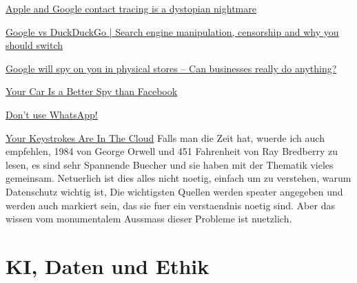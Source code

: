 \documentclass{report}
\begin{document}
\hyperlink{https://youtube.com/watch?v=WRalTWAFBY4}{Apple and Google contact tracing is a dystopian nightmare}

\hyperlink{https://youtube.com/watch?v=SrsCEbi5N7Y}{Google vs DuckDuckGo | Search engine manipulation, censorship and why you should switch}

\hyperlink{https://youtube.com/watch?v=vZBa5-wFAfQ}{Google will spy on you in physical stores – Can businesses really do anything?}

\hyperlink{https://youtube.com/watch?v=WX2SWUMt_fk}{Your Car Is a Better Spy than Facebook}

\hyperlink{https://youtube.com/watch?v=shpiVm1qpnw}{Don't use WhatsApp!}

\hyperlink{https://youtube.com/watch?v=vCRX0MZm2KI}{Your Keystrokes Are In The Cloud}
\newline
Falls man die Zeit hat, wuerde ich auch empfehlen, 1984 von George Orwell und 451 Fahrenheit von Ray Bredberry zu lesen, es sind sehr Spannende Buecher und sie haben mit der Thematik vieles gemeinsam.
Netuerlich ist dies alles nicht noetig, einfach um zu verstehen, warum Datenschutz wichtig ist, Die wichtigsten Quellen werden speater angegeben und werden auch markiert sein, das sie fuer ein verstaendnis noetig sind. Aber das wissen vom monumentalem Aussmass dieser Probleme ist nuetzlich. 
\chapter{KI, Daten und Ethik}
\end{document}
